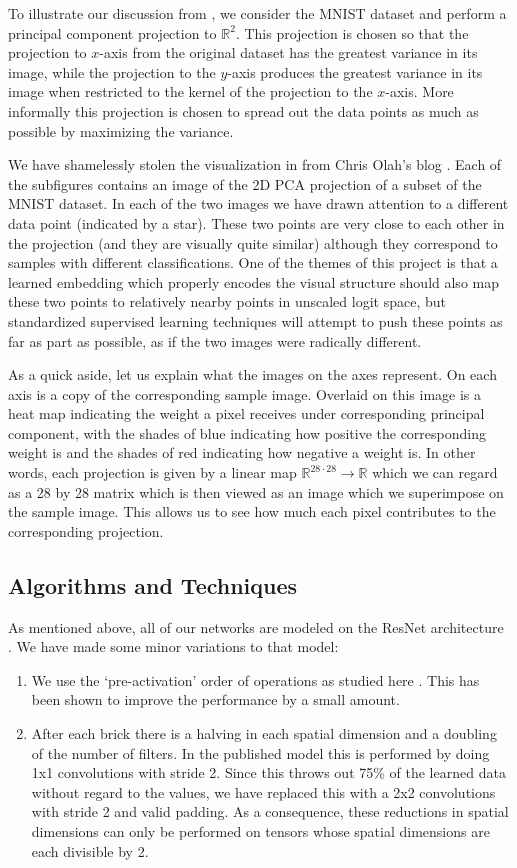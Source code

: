 \documentclass[english,a4paper,oneside]{amsart}
\theoremstyle{definition}
\begin{document}
To illustrate our discussion from , we consider the MNIST dataset and perform a principal component projection to $\mathbb{R}^2$. This projection is chosen so that the projection to $x$-axis  from the original dataset has the greatest variance in its image, while the projection to the $y$-axis produces the greatest variance in its image when restricted to the kernel of the projection to the $x$-axis. More informally this projection is chosen to spread out the data points as much as possible by maximizing the variance.

We have shamelessly stolen the visualization in  from Chris Olah's blog \cite{VisMNIST}. Each of the subfigures contains an image of the 2D PCA projection of a subset of the MNIST dataset. In each of the two images we have drawn attention to a different data point (indicated by a star). These two points are very close to each other in the projection (and they are visually quite similar) although they correspond to samples with different classifications.  One of the themes of this project is that a learned embedding which properly encodes the visual structure should also map these two points to relatively nearby points in unscaled logit space, but standardized supervised learning techniques will attempt to push these points as far as part as possible, as if the two images were radically different.

As a quick aside, let us explain what the images on the axes represent. On each axis is a copy of the corresponding sample image. Overlaid on this image is a heat map indicating the weight a pixel receives under corresponding principal component, with the shades of blue indicating how positive the corresponding weight is and the shades of red indicating how negative a weight is. In other words, each projection is given by a linear map $\mathbb{R}^{28\cdot 28}\to \mathbb{R}$ which we can regard as a 28 by 28 matrix which is then viewed as an image which we superimpose on the sample image. This allows us to see how much each pixel contributes to the corresponding projection.
\subsection{Algorithms and Techniques}
As mentioned above, all of our networks are modeled on the ResNet architecture \cite{ResNet}. We have made some minor variations to that model:
\begin{enumerate}
	\item We use the `pre-activation' order of operations as studied here \cite{Preactive}. This has been shown to improve the performance by a small amount.
	\item After each brick there is a halving in each spatial dimension and a doubling of the number of filters. In the published model this is performed by doing 1x1 convolutions with stride 2. Since this throws out 75\% of the learned data without regard to the values, we have replaced this with a 2x2 convolutions with stride 2 and valid padding. As a consequence, these reductions in spatial dimensions can only be performed on tensors  whose spatial dimensions are each divisible by 2.
\end{enumerate}
\end{document}
